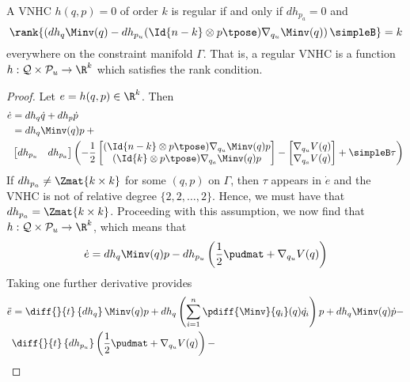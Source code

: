 \begin{thm}\label{thm:vnhc-regularity}
    A VNHC \(h(q,p) = 0\) of order \(k\) is regular if and only if \(dh_{p_a} = 0\) 
    and
    \[
        \rank{\left(dh_q \Minv(q) - 
          dh_{p_u} (\Id{n-k} \otimes p\tpose)\nabla_{q_u}\Minv(q) 
         \right)\simpleB} = k
    \]
    everywhere on the constraint manifold \(\Gamma\).
    That is, a regular VNHC is a function 
    \(h : \mathcal{Q} \times \mathcal{P}_u \rightarrow \R^k\) which satisfies
    the rank condition.
\end{thm}
\begin{proof}
    Let \(e = h(q,p) \in \R^k\). Then 
    \begin{align*}
        \dot{e} &= dh_q \dot{q} + dh_p \dot{p} \\
                &= dh_q \Minv(q)p +{}  \\
            & \begin{bmatrix} dh_{p_u} & dh_{p_a} \end{bmatrix}
        \left( -\frac{1}{2} \begin{bmatrix}
            (\Id{n-k} \otimes p\tpose) \nabla_{q_u}\Minv(q)p \\
            (\Id{k} \otimes p\tpose) \nabla_{q_a}\Minv(q)p
            \end{bmatrix} - \begin{bmatrix}
            \nabla_{q_u}V(q) \\
            \nabla_{q_a}V(q)
        \end{bmatrix} + \simpleB \tau\right)
    \end{align*}
    If \(dh_{p_a} \neq \Zmat{k \times k}\) for some \((q,p)\) on \(\Gamma\), 
    then \(\tau\) appears in \(\dot{e}\) and the VNHC is not of relative degree
    \(\{2,2,\ldots,2\}\).
    Hence, we must have that \(dh_{p_a} = \Zmat{k \times k}\).
    Proceeding with this assumption, we now find that
    \(h : \mathcal{Q} \times \mathcal{P}_u \rightarrow \R^k\), which means that
    \[
        \dot{e} = dh_q \Minv(q)p - 
        dh_{p_u} \left(\frac{1}{2} \pudmat + \nabla_{q_u}V(q)\right)
    \]
    Taking one further derivative provides
    \begin{align*}
        \ddot{e} &= \diff{}{t}\left\{dh_q\right\}\Minv(q) p + 
        dh_q \left(\sum\limits_{i=1}^n \pdiff{\Minv}{q_i}(q)\dot{q_i}\right)p + 
        dh_q \Minv(q) \dot{p} - \\
         & \diff{}{t}\left\{dh_{p_u}\right\}
         \left(\frac{1}{2}\pudmat + \nabla_{q_u}V(q)\right) - \\

\end{align*}
\end{proof}
